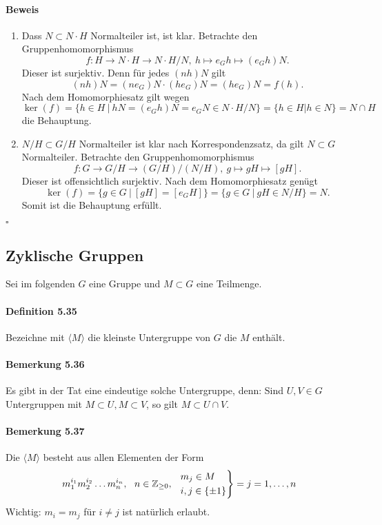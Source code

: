 \documentclass{scrartcl}
\begin{document}
\paragraph{Beweis}
\begin{enumerate}{}
\item Dass $N \subset N \cdot H$ Normalteiler ist, ist klar. Betrachte den
  Gruppenhomomorphismus
  \[
    f: H \longrightarrow N \cdot H \longrightarrow N \cdot H/N,
    ~h \longmapsto e_Gh \longmapsto (e_Gh)N. 
  \]
  Dieser ist surjektiv. Denn für jedes $(nh)N$ gilt
  \[
    (nh)N = (ne_G)N \cdot (he_G)N = (he_G)N = f(h).
  \]
  Nach dem Homomorphiesatz gilt wegen
  \[
    \ker(f) = \{h \in H ~|~ hN = (e_Gh)N = e_GN \in N \cdot H/N\} = \{h \in H |
    h \in N\} = N \cap H
  \]
  die Behauptung.

\item $N/H \subset G/H$ Normalteiler ist klar nach Korrespondenzsatz, da gilt $N
  \subset G$ Normalteiler. Betrachte den Gruppenhomomorphismus
  \[
    f: G \longrightarrow G/H \longrightarrow (G/H)/(N/H),~
    g \longmapsto gH \longmapsto [gH].
  \]
  Dieser ist offensichtlich surjektiv. Nach dem Homomorphiesatz genügt
  \[
    \ker(f) = \{g \in G ~|~ [gH] = [e_GH]\} = \{g \in G ~|~ gH \in N/H\} = N.
  \]
  Somit ist die Behauptung erfüllt.
\end{enumerate}
\hfill $\square$

\subsection{Zyklische Gruppen}
\label{subsec:zyklischegruppen}

Sei im folgenden $G$ eine Gruppe und $M \subset G$ eine Teilmenge.

\paragraph{Definition 5.35}
Bezeichne mit $\langle M \rangle$ die kleinste Untergruppe von $G$ die $M$
enthält.

\paragraph{Bemerkung 5.36}
Es gibt in der Tat eine eindeutige solche Untergruppe, denn: Sind $U,V \in G$
Untergruppen mit $M \subset U, M \subset V$,  so gilt $M \subset U \cap V$.

\paragraph{Bemerkung 5.37}
Die $\langle M \rangle$ besteht aus allen Elementen der Form
\[
  m_1^{i_1}m_2^{i_2} \dots m_n^{i_n} ,~~ n \in \mathbb{Z}_{\geq
    0},~~
  \begin{rcases}
    m_j \in M \\
    i,j \in \{\pm 1\}
  \end{rcases} = j = 1, \dots, n
\]
Wichtig: $m_i = m_j$ für $i \neq j$ ist natürlich erlaubt.
\end{document}
